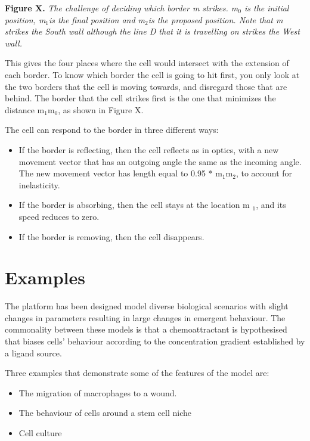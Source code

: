 \documentclass[12pt,a4paper]{report}
\begin{document}
{\bfseries Figure X. }{\itshape The challenge of deciding which border m 
strikes. m$_{0}$ is the initial position, m$_{1 }$is the final 
position and m$_{2 }$is the proposed position. Note that m strikes 
the South wall although the line D that it is travelling on strikes the 
West wall.}



This gives the four places where the cell would intersect with the 
extension of each border. To know which border the cell is going to hit 
first, you only look at the two borders that the cell is moving towards, 
and disregard those that are behind. The border that the cell strikes 
first is the one that minimizes the distance m$_{1}$m$_{0}$, as 
shown in Figure X. 



The cell can respond to the border in three different ways: 

\begin{itemize}
\item If the border is reflecting, then the cell reflects as in optics, 
with a new movement vector that has an outgoing angle the same as the 
incoming angle. The new movement vector has length equal to 0.95 * m$_{
1}$m$_{2}$, to account for inelasticity.
\item If the border is absorbing, then the cell stays at the location m
$_{1}$, and its speed reduces to zero.
\item If the border is removing, then the cell disappears.
\end{itemize}


\section{Examples}
The platform has been designed model diverse biological scenarios with 
slight changes in parameters resulting in large changes in emergent 
behaviour. The commonality between these models is that a 
chemoattractant is hypothesised that biases cells' behaviour according 
to the concentration gradient established by a ligand source.



Three examples that demonstrate some of the features of the model are:

\begin{itemize}
\item The migration of macrophages to a wound.
\item The behaviour of cells around a stem cell niche
\item Cell culture
\end{itemize}
\end{document}
